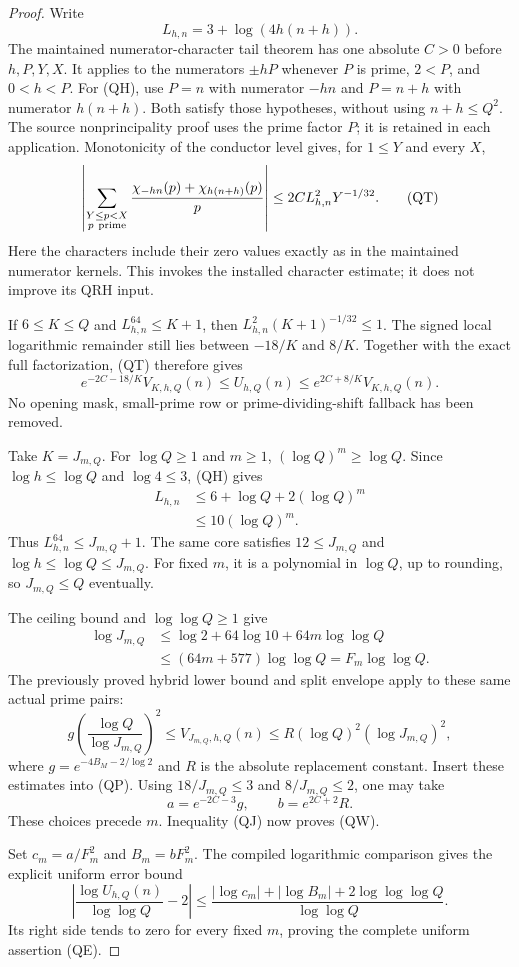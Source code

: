\documentclass[11pt]{article}
\begin{document}
\begin{proof}
Write
\[
                   L_{h,n}=3+\log(4h(n+h)).
\]
The maintained numerator-character tail theorem has one absolute
\(C>0\) before \(h,P,Y,X\). It applies to the numerators
\(\pm hP\) whenever \(P\) is prime, \(2<P\), and \(0<h<P\).
For (QH), use \(P=n\) with numerator \(-hn\) and
\(P=n+h\) with numerator \(h(n+h)\). Both satisfy those
hypotheses, without using \(n+h\leq Q^2\).
The source nonprincipality proof uses the prime factor \(P\);
it is retained in each application. Monotonicity of the conductor
level gives, for \(1\leq Y\) and every \(X\),
\[
 \left|\sum_{\substack{Y\leq p<X\\p\ {\rm prime}}}
       \frac{\chi_{-hn}(p)+\chi_{h(n+h)}(p)}p\right|
 \leq 2C L_{h,n}^2Y^{-1/32}.
 \tag{QT}
\]
Here the characters include their zero values exactly as in the
maintained numerator kernels. This invokes the installed character
estimate; it does not improve its QRH input.

If \(6\leq K\leq Q\) and \(L_{h,n}^{64}\leq K+1\),
then \(L_{h,n}^2(K+1)^{-1/32}\leq1\). The signed local
logarithmic remainder still lies between \(-18/K\) and \(8/K\).
Together with the exact full factorization, (QT) therefore gives
\[
 e^{-2C-18/K}V_{K,h,Q}(n)
 \leq U_{h,Q}(n)
 \leq e^{2C+8/K}V_{K,h,Q}(n).
 \tag{QP}
\]
No opening mask, small-prime row or prime-dividing-shift fallback
has been removed.

Take \(K=J_{m,Q}\). For \(\log Q\geq1\) and \(m\geq1\),
\((\log Q)^m\geq\log Q\). Since
\(\log h\leq\log Q\) and \(\log4\leq3\), (QH) gives
\[
 \begin{split}
 L_{h,n}
 &\leq6+\log Q+2(\log Q)^m\\
 &\leq10(\log Q)^m.
 \end{split}
\]
Thus \(L_{h,n}^{64}\leq J_{m,Q}+1\).
The same core satisfies \(12\leq J_{m,Q}\) and
\(\log h\leq\log Q\leq J_{m,Q}\).
For fixed \(m\), it is a polynomial in \(\log Q\), up to
rounding, so \(J_{m,Q}\leq Q\) eventually.

The ceiling bound and \(\log\log Q\geq1\) give
\[
 \begin{split}
 \log J_{m,Q}
 &\leq \log2+64\log10+64m\log\log Q\\
 &\leq(64m+577)\log\log Q=F_m\log\log Q.
 \end{split}
 \tag{QJ}
\]
The previously proved hybrid lower bound and split envelope apply
to these same actual prime pairs:
\[
 g\left(\frac{\log Q}{\log J_{m,Q}}\right)^2
 \leq V_{J_{m,Q},h,Q}(n)
 \leq R(\log Q)^2(\log J_{m,Q})^2,
\]
where \(g=e^{-4B_M-2/\log2}\) and \(R\) is the absolute
replacement constant. Insert these estimates into (QP).
Using \(18/J_{m,Q}\leq3\) and \(8/J_{m,Q}\leq2\),
one may take
\[
                  a=e^{-2C-3}g,\qquad b=e^{2C+2}R.
\]
These choices precede \(m\). Inequality (QJ) now proves (QW).

Set \(c_m=a/F_m^2\) and \(B_m=bF_m^2\). The compiled logarithmic
comparison gives the explicit uniform error bound
\[
 \left|\frac{\log U_{h,Q}(n)}{\log\log Q}-2\right|
 \leq
 \frac{|\log c_m|+|\log B_m|+2\log\log\log Q}{\log\log Q}.
\]
Its right side tends to zero for every fixed \(m\), proving the
complete uniform assertion (QE).
\end{proof}
\end{document}

